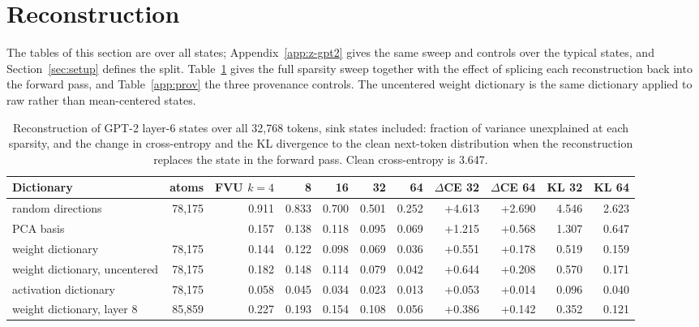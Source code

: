 \section{Reconstruction}\label{app:recon}
The tables of this section are over all states; Appendix~\ref{app:z-gpt2} gives the same sweep and controls over the typical states, and Section~\ref{sec:setup} defines the split. Table~\ref{app:fvu} gives the full sparsity sweep together with the effect of splicing each reconstruction back into the forward pass, and Table~\ref{app:prov} the three provenance controls. The uncentered weight dictionary is the same dictionary applied to raw rather than mean-centered states.
\begin{table}[H]\centering\footnotesize
\caption{Reconstruction of GPT-2 layer-6 states over all 32{,}768 tokens, sink states included: fraction of variance unexplained at each sparsity, and the change in cross-entropy and the KL divergence to the clean next-token distribution when the reconstruction replaces the state in the forward pass. Clean cross-entropy is 3.647.}\label{app:fvu}
\begin{adjustbox}{max width=\linewidth}
\begin{tabular}{lrrrrrrrrrr}\toprule
Dictionary & atoms & FVU $k{=}4$ & 8 & 16 & 32 & 64 & $\Delta$CE 32 & $\Delta$CE 64 & KL 32 & KL 64 \\ \midrule
random directions & 78,175 & 0.911 & 0.833 & 0.700 & 0.501 & 0.252 & +4.613 & +2.690 & 4.546 & 2.623 \\
PCA basis &  & 0.157 & 0.138 & 0.118 & 0.095 & 0.069 & +1.215 & +0.568 & 1.307 & 0.647 \\
weight dictionary & 78,175 & 0.144 & 0.122 & 0.098 & 0.069 & 0.036 & +0.551 & +0.178 & 0.519 & 0.159 \\
weight dictionary, uncentered & 78,175 & 0.182 & 0.148 & 0.114 & 0.079 & 0.042 & +0.644 & +0.208 & 0.570 & 0.171 \\
activation dictionary & 78,175 & 0.058 & 0.045 & 0.034 & 0.023 & 0.013 & +0.053 & +0.014 & 0.096 & 0.040 \\
weight dictionary, layer 8 & 85,859 & 0.227 & 0.193 & 0.154 & 0.108 & 0.056 & +0.386 & +0.142 & 0.352 & 0.121 \\
\bottomrule\end{tabular}\end{adjustbox}
\end{table}
